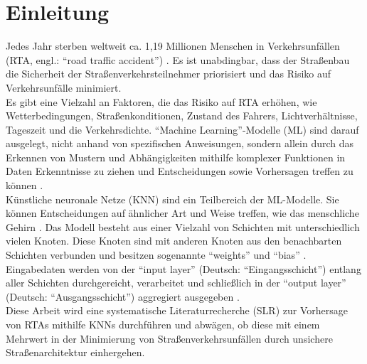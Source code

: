 \documentclass{scrartcl}
\begin{document}

\onehalfspacing
\tableofcontents
\newpage

\section{Einleitung}

Jedes Jahr sterben weltweit ca. 1,19 Millionen Menschen in Verkehrsunfällen
(RTA, engl.: \enquote{road traffic accident}) \cite{who}.
Es ist unabdingbar, dass der Straßenbau die Sicherheit der Straßenverkehrsteilnehmer
priorisiert und das Risiko auf Verkehrsunfälle minimiert.
\medskip \\
Es gibt eine Vielzahl an Faktoren, die das Risiko auf RTA erhöhen, wie
Wetterbedingungen, Straßenkonditionen, Zustand des Fahrers, Lichtverhältnisse,
Tageszeit und die Verkehrsdichte. \enquote{Machine Learning}-Modelle (ML) sind darauf
ausgelegt, nicht anhand von spezifischen Anweisungen, sondern allein durch das Erkennen
von Mustern und Abhängigkeiten mithilfe komplexer Funktionen \cite{predict}
in Daten Erkenntnisse zu ziehen und Entscheidungen sowie Vorhersagen treffen
zu können \cite{sap}.
\medskip \\
Künstliche neuronale Netze (KNN) sind ein Teilbereich der ML-Modelle. Sie können
Entscheidungen auf ähnlicher Art und Weise treffen, wie das menschliche Gehirn \cite{ibm}.
Das Modell besteht aus einer Vielzahl von Schichten mit unterschiedlich vielen
Knoten. Diese Knoten sind mit anderen Knoten aus den benachbarten Schichten verbunden
und besitzen sogenannte \enquote{weights} und \enquote{bias} \cite{ibm}.
Eingabedaten werden von der \enquote{input layer} (Deutsch: \enquote{Eingangsschicht})
entlang aller Schichten durchgereicht, verarbeitet und schließlich in der
\enquote{output layer} (Deutsch: \enquote{Ausgangsschicht}) aggregiert ausgegeben \cite{ibm}.
\medskip \\
Diese Arbeit wird eine systematische Literaturrecherche (SLR) zur Vorhersage von RTAs
mithilfe KNNs durchführen und abwägen, ob diese mit einem Mehrwert in der Minimierung
von Straßenverkehrsunfällen durch unsichere Straßenarchitektur einhergehen.
\end{document}
